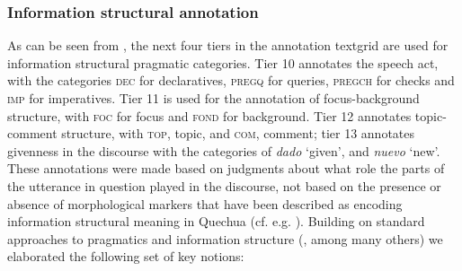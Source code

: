 \documentclass[output=paper]{LSP/langsci}
\begin{document}
\subsubsection{Information structural annotation}
\label{sec:buc:3.3.2}
As can be seen from , the next four tiers in the annotation textgrid are used for information structural pragmatic categories. %
Tier 10 annotates the speech act, with the categories \textsc{dec} for declaratives, \textsc{pregq} for queries, 
\textsc{pregch} for checks and \textsc{imp} for imperatives. 
Tier 11 is used for the annotation of focus-background structure, with \textsc{foc} for focus and \textsc{fond} for background. 
Tier 12 annotates topic-comment structure, with \textsc{top}, topic, and \textsc{com}, comment; 
tier 13 annotates givenness in the discourse with the categories of \textit{dado} `given', and \textit{nuevo} `new'. These annotations were made based on judgments about what role the parts of the utterance in question played in the discourse, not based on the presence or absence of morphological markers that have been described as encoding information structural meaning in Quechua (cf. e.g. \citealt{Woelck1972,Weber1986,Muysken1995,GomezRendon2006}). Building on standard approaches to pragmatics and information structure (\citealt{Austin1962,Searle1969,Chafe1976,Bolinger1989,Rooth1992,Grice1997,Baumann2006,Krifka2007}, among many others) we elaborated the following set of key notions:  
\end{document}
